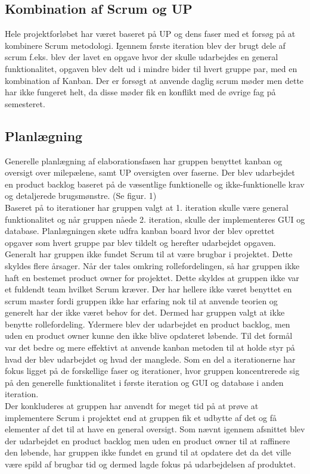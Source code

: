 \subsection{Kombination af Scrum og UP} \label{sec:scrum og up}
Hele projektforløbet har været baseret på UP og dens faser med et forsøg på at kombinere Scrum metodologi. Igennem første iteration blev der brugt dele af scrum f.eks. blev der lavet en opgave hvor der skulle udarbejdes en general funktionalitet, opgaven blev delt ud i mindre bider til hvert gruppe par, med en kombination af Kanban. Der er forsøgt at anvende daglig scrum møder men dette har ikke fungeret helt, da disse møder fik en konflikt med de øvrige fag på semesteret. 
\subsection{Planlægning} \label{plan}
Generelle planlægning af elaborationsfasen har gruppen benyttet kanban og oversigt over milepælene, samt UP oversigten over faserne. Der blev udarbejdet en product backlog baseret på de væsentlige funktionelle og ikke-funktionelle krav og detaljerede brugsmønstre. (Se figur. 1)\\
Baseret på to iterationer har gruppen valgt at 1. iteration skulle være general funktionalitet og når gruppen nåede 2. iteration, skulle der implementeres GUI og database. Planlægningen skete udfra kanban board hvor der blev oprettet opgaver som hvert gruppe par blev tildelt og herefter udarbejdet opgaven. \\
Generalt har gruppen ikke fundet Scrum til at være brugbar i projektet. Dette skyldes flere årsager. Når der tales omkring rollefordelingen, så har gruppen ikke haft en bestemet product owner for projektet. Dette skyldes at gruppen ikke var et fuldendt team hvilket Scrum kræver. Der har hellere ikke været benyttet en scrum master fordi gruppen ikke har erfaring nok til at anvende teorien og generelt har der ikke været behov for det. Dermed har gruppen valgt at ikke benytte rollefordeling. Ydermere blev der udarbejdet en product backlog, men uden en product owner kunne den ikke blive opdateret løbende. Til det formål var det bedre og mere effektivt at anvende kanban metoden til at holde styr på hvad der blev udarbejdet og hvad der manglede. Som en del a iterationerne har fokus ligget på de forskellige faser og iterationer, hvor gruppen koncentrerede sig på den generelle funktionalitet i første iteration og GUI og database i anden iteration.\\
Der konkluderes at gruppen har anvendt for meget tid på at prøve at implementere Scrum i projektet end at gruppen fik et udbytte af det og få elementer af det til at have en general oversigt. Som nævnt igennem afsnittet blev der udarbejdet en product backlog men uden en product owner til at raffinere den løbende, har gruppen ikke fundet en grund til at opdatere det da det ville være spild af brugbar tid og dermed lagde fokus på udarbejdelsen af produktet. 

